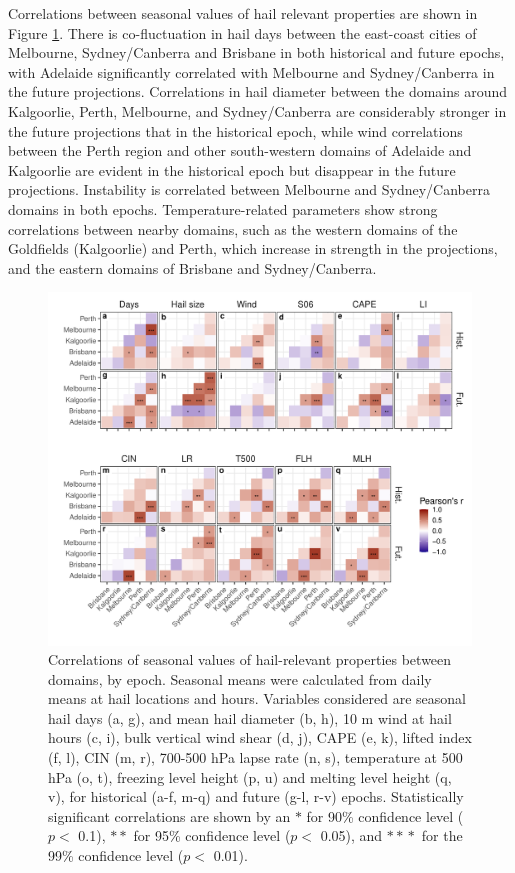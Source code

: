 \documentclass[]{agujournal2019}\usepackage[]{graphicx}\usepackage[]{xcolor}
\begin{document}
Correlations between seasonal values of hail relevant properties are shown in
Figure \ref{fig:correlations}. There is co-fluctuation in hail days between the
east-coast cities of Melbourne, Sydney/Canberra and Brisbane in both historical
and future epochs, with Adelaide significantly correlated with Melbourne and
Sydney/Canberra in the future projections. Correlations in hail diameter between
the domains around Kalgoorlie, Perth, Melbourne, and Sydney/Canberra are
considerably stronger in the future projections that in the historical epoch,
while wind correlations between the Perth region and other south-western domains
of Adelaide and Kalgoorlie are evident in the historical epoch but disappear in
the future projections. Instability is correlated between Melbourne and
Sydney/Canberra domains in both epochs. Temperature-related parameters show
strong correlations between nearby domains, such as the western domains of the
Goldfields (Kalgoorlie) and Perth, which increase in strength in the
projections, and the eastern domains of Brisbane and Sydney/Canberra.

\begin{figure}[!ht]
      \includegraphics[width=\textwidth]{figures/correlations}
      \caption{Correlations of seasonal values of hail-relevant properties
      between domains, by epoch. Seasonal means were calculated from daily means
      at hail locations and hours. Variables considered are seasonal hail days
      (a, g), and mean hail diameter (b, h), 10 m wind at hail hours (c, i),
      bulk vertical wind shear (d, j), CAPE (e, k), lifted index (f, l), CIN (m,
      r), 700-500 hPa lapse rate (n, s), temperature at 500 hPa (o, t), freezing
      level height (p, u) and melting level height (q, v), for historical (a-f,
      m-q) and future (g-l, r-v) epochs. Statistically significant correlations
      are shown by an $\ast{}$ for 90\% confidence level ($p <$ 0.1),
      $\ast{}\!\ast{}$ for 95\% confidence level ($p <$ 0.05), and
      $\ast{}\!\ast{}\!\!\ast{}$ for the 99\% confidence level ($p <$ 0.01).}
      \label{fig:correlations}
\end{figure}
\end{document}
